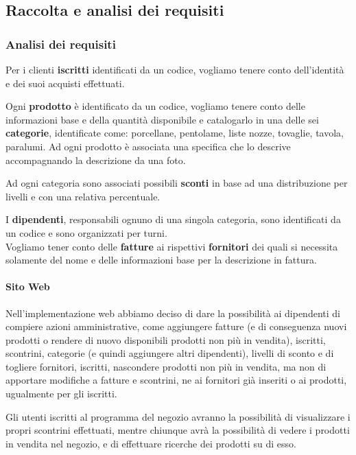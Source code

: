 \subsection{Raccolta e analisi dei requisiti}

\subsubsection{Analisi dei requisiti}
Per i clienti \textbf{iscritti} identificati da un codice, vogliamo tenere conto dell'identit\`a e dei suoi acquisti effettuati.



Ogni \textbf{prodotto} \`e identificato da un codice, vogliamo tenere conto delle informazioni base e della quantit\`a disponibile e catalogarlo in una delle sei \textbf{categorie}, identificate come: porcellane, pentolame, liste nozze, tovaglie, tavola, paralumi. Ad ogni prodotto \`e associata una specifica che lo descrive accompagnando la descrizione da una foto.


Ad ogni categoria sono associati possibili \textbf{sconti} in base ad una distribuzione per livelli e con una relativa percentuale.


I \textbf{dipendenti}, responsabili ognuno di una singola categoria, sono identificati da un codice e sono organizzati per turni. \\

Vogliamo tener conto delle \textbf{fatture} ai rispettivi \textbf{fornitori} dei quali si necessita solamente del nome e delle informazioni base per la descrizione in fattura.

\paragraph*{Sito Web} Nell'implementazione web abbiamo deciso di dare la possibilit\`a ai dipendenti di compiere azioni amministrative, come aggiungere fatture (e di conseguenza nuovi prodotti o rendere di nuovo disponibili prodotti non pi\`u in vendita), iscritti, scontrini, categorie (e quindi aggiungere altri dipendenti), livelli di sconto e di togliere fornitori, iscritti, nascondere prodotti non pi\`u in vendita, ma non di apportare modifiche a fatture e scontrini, ne ai fornitori gi\`a inseriti o ai prodotti, ugualmente per gli iscritti.

Gli utenti iscritti al programma del negozio avranno la possibilit\`a di visualizzare i propri scontrini effettuati, mentre chiunque avr\`a la possibilit\`a di vedere i prodotti in vendita nel negozio, e di effettuare ricerche dei prodotti su di esso.

